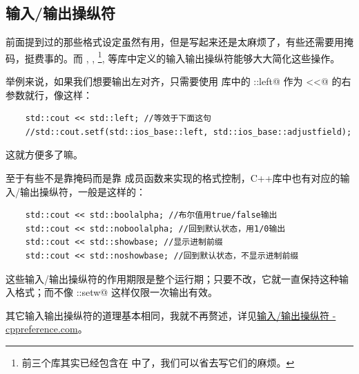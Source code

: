 \subsection*{输入/输出操纵符}
前面提到过的那些格式设定虽然有用，但是写起来还是太麻烦了，有些还需要用掩码，挺费事的。而 \lstinline@ios@, \lstinline@istream@, \lstinline@ostream@\footnote{前三个库其实已经包含在 \lstinline@iostream@ 中了，我们可以省去写它们的麻烦。}, \lstinline@iomanip@ 等库中定义的输入输出操纵符能够大大简化这些操作。\par
举例来说，如果我们想要输出左对齐，只需要使用 \lstinline@ios@ 库中的 \lstinline@std::left@ 作为 \lstinline@<<@ 的右参数就行，像这样：
\begin{lstlisting}
    std::cout << std::left; //等效于下面这句
    //std::cout.setf(std::ios_base::left, std::ios_base::adjustfield);
\end{lstlisting}
这就方便多了嘛。\par
至于有些不是靠掩码而是靠 \lstinline@unsetf@ 成员函数来实现的格式控制，C++库中也有对应的输入/输出操纵符，一般是这样的：
\begin{lstlisting}
    std::cout << std::boolalpha; //布尔值用true/false输出
    std::cout << std::noboolalpha; //回到默认状态，用1/0输出
    std::cout << std::showbase; //显示进制前缀
    std::cout << std::noshowbase; //回到默认状态，不显示进制前缀
\end{lstlisting}\par
这些输入/输出操纵符的作用期限是整个运行期；只要不改，它就一直保持这种输入格式；而不像 \lstinline@std::setw@ 这样仅限一次输出有效。\par
其它输入输出操纵符的道理基本相同，我就不再赘述，详见\href{https://zh.cppreference.com/w/cpp/io/manip}{输入/输出操纵符 - cppreference.com}。\par
